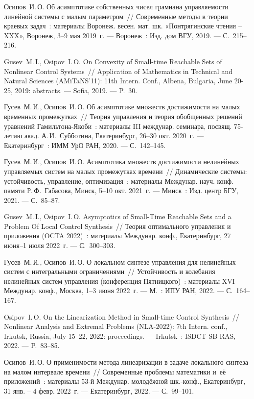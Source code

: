 \documentclass[../main.tex]{subfiles}
\begin{document}
\begin{thebibliography}{99}
Осипов~И.\,О. Об асимптотике собственных чисел грамиана управляемости линейной системы с малым параметром~// Современные методы в теории краевых задач~: материалы Воронеж. весен. мат. шк. «Понтрягинские чтения – XXX», Воронеж, 3--9 мая 2019~г. --- Воронеж~: Изд. дом ВГУ, 2019. --- С.~215--216.

Gusev~M.\,I., Osipov~I.\,O. On Convexity of Small-time Reachable Sets of Nonlinear Control Systems~// Application of Mathematics in Technical and Natural Sciences (AMiTaNS'11): 11th Intern. Conf., Albena, Bulgaria, June 20-25, 2019: abstracts. --- Sofia, 2019. --- P.~30.

Гусев~М.\,И., Осипов~И.\,О. Об асимптотике множеств достижимости на малых временных промежутках~// Теория управления и теория обобщенных решений уравнений Гамильтона-Якоби~: материалы III междунар. семинара, посвящ. 75-летию акад. А.\,И.~Субботина, Екатеринбург, 26--30 окт. 2020~г. --- Екатеринбург~: ИММ УрО РАН, 2020. --- С.~142--145.


Гусев~М.\,И., Осипов~И.\,О. Асимптотика множеств достижимости нелинейных управляемых систем на малых промежутках времени~// Динамические системы: устойчивость, управление, оптимизация~: материалы Междунар. науч. конф. памяти Р.\,Ф.~Габасова, Минск, 5--10 окт. 2021~г. --- Минск~: Изд. центр БГУ, 2021. --- С.~85--87. 

Gusev~M.\,I., Osipov~I.\,O. Asymptotics of Small-Time Reachable Sets and a Problem Of Local Control Synthesis~// Теория оптимального управления и приложения (OCTA 2022)~: материалы Междунар. конф., Екатеринбург, 27 июня–1 июля 2022~г. --- С.~300--303.

Гусев~М.\,И., Осипов~И.\,О. О локальном синтезе управления для нелинейных систем с интегральными ограничениями~// Устойчивость и колебания нелинейных систем управления (конференция Пятницкого)~: материалы XVI Междунар. конф., Москва, 1--3 июня 2022~г. --- М.~: ИПУ РАН, 2022. --- С.~164--167.

Osipov~I.\,O. On the Linearization Method in Small-time Control Synthesis~// Nonlinear Analysis and Extremal Problems (NLA-2022): 7th Intern. conf., Irkutsk, Russia, July 15–22, 2022: proceedings. --- Irkutsk~: ISDCT SB RAS, 2022. --- P.~83--85.

Осипов~И.\,О. О применимости метода линеаризации в задаче локального синтеза на малом интервале времени~// Современные проблемы математики и~её приложений~: материалы 53-й Междунар. молодёжной шк.-конф., Екатеринбург, 31 янв. -- 4 февр. 2022~г. --- Екатеринбург, 2022. --- С.~99--101.


\end{thebibliography}
\end{document}
